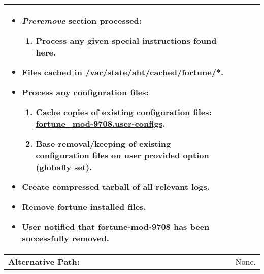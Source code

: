 \begin{tabularx}{\linewidth}{|l|X|}
\begin{minipage}{\linewidth}
\begin{itemize}
\begin{enumerate}
		\end{enumerate}
    \item \emph{Preremove} section processed:
    \begin{enumerate}
      \item Process any given special instructions found here.
    \end{enumerate}
		\item Files cached in \url{/var/state/abt/cached/fortune/*}.
		\item Process any configuration files:
    \begin{enumerate}
      \item Cache copies of existing configuration files: \url{fortune_mod-9708.user-configs}.
			\item Base removal/keeping of existing configuration files on user provided option (globally set).
    \end{enumerate}
		\item Create compressed tarball of all relevant logs.
		\item Remove fortune installed files.
		\item User notified that fortune-mod-9708 has been successfully removed.
  \end{itemize}
  \vspace{0.05em}
\end{minipage}
\\
\hline 
\textbf{Alternative Path:} & None. 
\\
\hline
\end{tabularx}

\newpage


